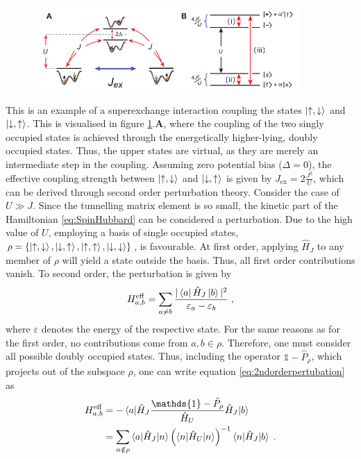 \begin{figure}[h]
	\centering
	\includegraphics[width=0.9\textwidth]{Figures/SXEschematic.pdf}
	\caption{\textit{\cite{Trotzky2008} }}
	\label{fig:superexchange}
\end{figure}
This is an example of a superexchange interaction coupling the states $\ket{\uparrow,\downarrow}$ and $\ket{\downarrow,\uparrow}$. This is visualised in figure \ref{fig:superexchange}.\textbf{A}, where the coupling of the two singly occupied states is achieved through the energetically higher-lying, doubly occupied states. Thus, the upper states are virtual, as they are merely an intermediate step in the coupling.
Assuming zero potential bias ($\Delta = 0$), the effective coupling strength between $\ket{\uparrow,\downarrow}$ and $\ket{\downarrow,\uparrow}$ is given by $J_{\mathrm{ex}} = 2 \frac{J^2}{U}$, which can be derived through second order perturbation theory.
Consider the case of $U \gg J$. Since the tunnelling matrix element is so small, the kinetic part of the Hamiltonian \eqref{eq:SpinHubbard} can be considered a perturbation. Due to the high value of $U$, employing a basis of single occupied states, $\rho = \{ \ket{\uparrow , \downarrow} , \ket{ \downarrow, \uparrow} , \ket{\uparrow,\uparrow} , \ket{\downarrow,\downarrow} \}$, is favourable. At first order, applying $\hat{H}_J$ to any member of $\rho$ will yield a state outside the basis. Thus, all first order contributions vanish. To second order, the perturbation is given by
\begin{align}
	H_{a,b}^{\mathrm{eff}} = \sum_{a \neq b} \frac{ |\bra{a} \hat{H}_{J}\ket{b}|^2}{\varepsilon_a - \varepsilon_b} \; , \label{eq:2ndorderpertubation}
\end{align}
where $\varepsilon$ denotes the energy of the respective state. For the same reasons as for the first order, no contributions come from $a,b \in \rho$. Therefore, one must consider all possible doubly occupied states. Thus, including the operator $\mathds{1} - \hat{P}_{\rho}$, which projects out of the subspace $\rho$, one can write equation \eqref{eq:2ndorderpertubation} as
\begin{align}
	H_{a,b}^{\mathrm{eff}} &=  - \braket{a|\hat{H}_J \frac{\mathds{1} - \hat{P}_{\rho}}{\hat{H}_U} \hat{H}_J|b} \nonumber \\
	&= \sum_{n \notin \rho} \braket{a|\hat{H}_J|n} \left( \braket{n |\hat{H}_U | n} \right)^{-1} \braket{n|\hat{H}_J|b} \; .
\end{align}
